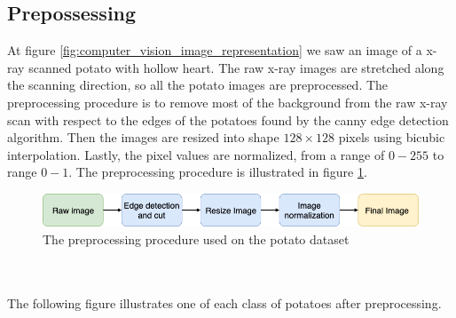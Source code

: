 \documentclass[11pt]{article}
\begin{document}
\subsection{Prepossessing}

At figure \ref{fig:computer_vision_image_representation} we saw an image of a x-ray scanned potato with hollow heart. The raw x-ray images are stretched along the scanning direction, so all the potato images are preprocessed. The preprocessing procedure is to remove most of the background from the raw x-ray scan with respect to the edges of the potatoes found by the canny edge detection algorithm. Then the images are resized into shape $128 \times 128$ pixels using bicubic interpolation. Lastly, the pixel values are normalized, from a range of $0 - 255$ to range $0 - 1$. The preprocessing procedure is illustrated in figure \ref{fig:data_preproces_potato}.
\begin{figure}[!h]
    \centering
    \includegraphics[scale=0.5]{figurer/data/preproces.png}
    \caption{The preprocessing procedure used on the potato dataset}
    \label{fig:data_preproces_potato}
\end{figure}
\\ \\
The following figure illustrates one of each class of potatoes after preprocessing.
\end{document}
